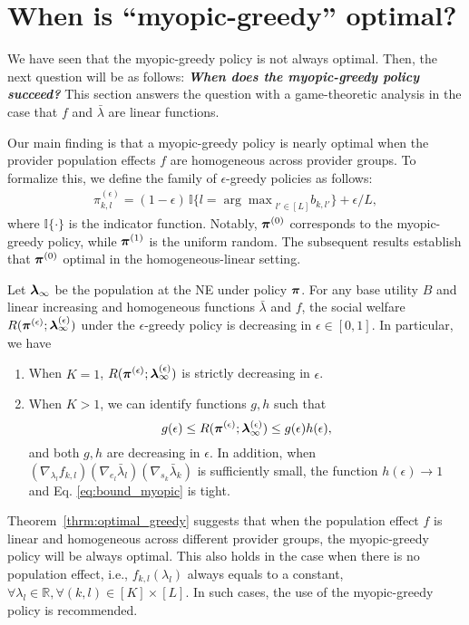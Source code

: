 \section{When is ``myopic-greedy'' optimal?}

We have seen that the myopic-greedy policy is not always optimal. Then, the next question will be as follows: \textbf{\textit{When does the myopic-greedy policy succeed?}} This section answers the question with a game-theoretic analysis in the case that $f$ and $\bar{\lambda}$ are linear functions.


Our main finding is that a myopic-greedy policy is nearly optimal when the provider population effects $f$ are homogeneous across provider groups. To formalize this, we define the family of $\epsilon$-greedy policies as follows:
\begin{align*}
    \pi_{k,l}^{(\epsilon)} = (1 - \epsilon) \, \mathbb{I} \{ l = {\arg\max}_{l' \in [L]} b_{k,l'} \} + 
    \epsilon / L,
\end{align*}
where $\mathbb{I}\{\cdot\}$ is the indicator function.
Notably, $\bm{\pi}^{(0)}$ corresponds to the myopic-greedy policy, 
while $\bm{\pi}^{(1)}$ is the uniform random.
The subsequent results establish that $\bm{\pi}^{(0)}$ 
optimal
in the homogeneous-linear setting.

\begin{theorem}\label{thrm:optimal_greedy}
Let $\bm{\lambda}_{\infty}$ be the population at the NE under policy $\bm{\pi}$. For any base utility $B$ and linear increasing and homogeneous functions $\bar{\lambda}$ and $f$, the social welfare $R(\bm{\pi}^{(\epsilon)}; \bm{\lambda}_{\infty}^{(\epsilon)})$ 
under the $\epsilon$-greedy policy 
is decreasing in $\epsilon\in[0, 1]$. In particular, we have
\begin{enumerate}
    \item When $K=1$, $R(\bm{\pi}^{(\epsilon)}; \bm{\lambda}_{\infty}^{(\epsilon)})$ is strictly decreasing in $\epsilon$.
    \item When $K>1$, we can identify functions $g,h$ such that 
    \begin{equation}\label{eq:bound_myopic}
        g(\epsilon) \leq R(\bm{\pi}^{(\epsilon)}; \bm{\lambda}^{(\epsilon)}_{\infty})\leq g(\epsilon)h(\epsilon),
    \end{equation}
    and both $g,h$ are decreasing in $\epsilon$. In addition, when $(\nabla_{\lambda_l} f_{k,l})(\nabla_{e_l} \bar{\lambda}_l) (\nabla_{s_k} \bar{\lambda}_k)$ is sufficiently small, the function $h(\epsilon)\rightarrow 1$ and Eq. \eqref{eq:bound_myopic} is tight.
\end{enumerate}
\end{theorem}
 Theorem~\ref{thrm:optimal_greedy} suggests that when the population effect $f$ is linear and homogeneous across different provider groups, the myopic-greedy policy will be always optimal. This also holds in the case when there is no population effect, i.e., $f_{k,l}(\lambda_l)$ always equals to a constant, $\forall \lambda_l \in \mathbb{R}, \forall (k,l) \in [K] \times [L]$. In such cases, the use of the myopic-greedy policy is recommended.

